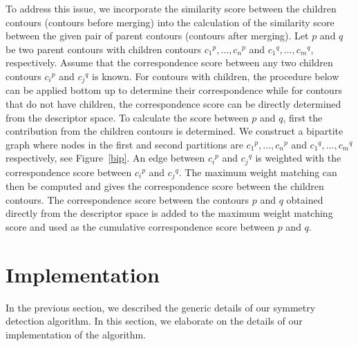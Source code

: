 \documentclass[review,journal]{vgtc}         %
\begin{document}
To address this issue, we incorporate the similarity score between the children contours 
(contours before merging) into the calculation of the similarity score between the given pair
of parent contours (contours after merging). Let $p$ and $q$ be two parent contours
with children contours ${c_1}^p,\dots,{c_n}^p$ and ${c_1}^q,\dots,{c_m}^q$, respectively. 
Assume that the correspondence score between any two
children contours ${c_i}^p$ and ${c_j}^q$ is known. For contours with children,
the procedure below can be applied bottom up to determine their correspondence
while for contours that do not have children, the correspondence score can be directly 
determined from the descriptor space. To calculate the score
between $p$ and $q$, first the contribution from the children contours 
is determined. We construct a bipartite graph where nodes in the first
and second partitions are ${c_1}^p,\dots,{c_n}^p$ and ${c_1}^q,\dots,{c_m}^q$ 
respectively, see Figure~\ref{bip}. An edge between ${c_i}^p$ and ${c_j}^q$ is weighted
with the correspondence score between ${c_i}^p$ and ${c_j}^q$. The maximum weight
matching can then be computed and gives the correspondence score between the children
contours. The correspondence score between the contours $p$ and $q$ obtained
directly from the descriptor space is added to the maximum weight matching score
and used as the cumulative correspondence score between $p$ and $q$. 
\section{Implementation}
In the previous section, we described the generic details of our symmetry
detection algorithm. In this section, we elaborate on the details of our 
implementation of the algorithm.
\end{document}
